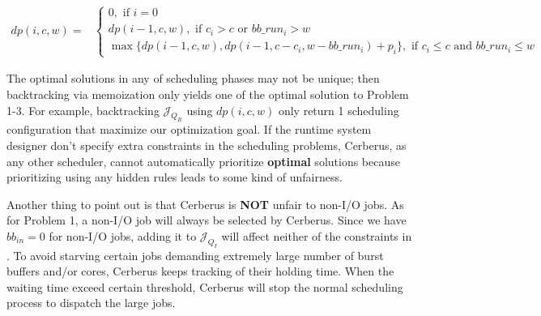 \begin{strip}
        \begin{align}
                dp(i, c, w) = &
                \left\{
                        \begin{array}{l}
                                0, \text{ if $i=0$ } \\ [0.6em]
                                dp(i-1, c, w), \text{ if $c_i > c$ or $bb\_run_i > w$} \\ [0.6em]
                                \max \{ dp(i-1, c, w), dp(i-1, c - c_i, w - bb\_run_i) + p_i \}, \text{ if $c_i \leq c$ and $bb\_run_i \leq w$}
                        \end{array} 
                \right.
                \label{Equ:MaxProductRecursion}
        \end{align}
\end{strip}


The optimal solutions in any of scheduling phases may not be unique;
then backtracking via memoization only yields one of the optimal solution to Problem 1-3.
For example, backtracking $\mathcal{J}_{Q_R}$ using $dp(i,c,w)$ only return 1 scheduling
configuration that maximize our optimization goal.
If the runtime system designer don't specify extra constraints in the scheduling problems,
Cerberus, as any other scheduler, cannot automatically prioritize \textbf{optimal} solutions
because prioritizing using any hidden rules leads to some kind of unfairness.

Another thing to point out is that Cerberus is \textbf{NOT} unfair to non-I/O jobs.
As for Problem 1, a non-I/O job will always be selected by Cerberus.
Since we have $bb_{in} = 0$ for non-I/O jobs, adding it to $\mathcal{J}_{Q_I}$ will affect
neither of the constraints in .
To avoid starving certain jobs demanding extremely large number of burst buffers and/or cores,
Cerberus keeps tracking of their holding time.
When the waiting time exceed certain threshold, Cerberus will stop the normal scheduling
process to dispatch the large jobs.



